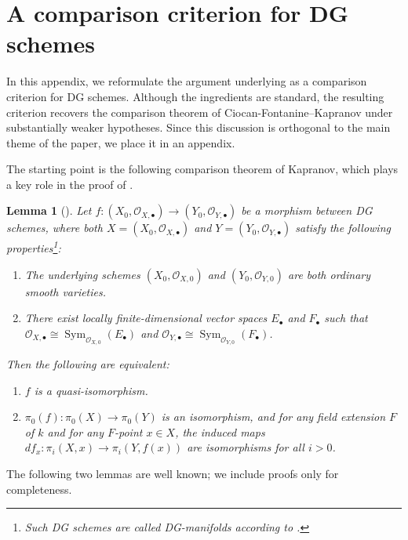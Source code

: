 \documentclass{article}
\numberwithin{equation}{section} %
\theoremstyle{plain}
\newtheorem{lemma}[theorem]{Lemma}
\theoremstyle{definition}
\theoremstyle{remark}
\begin{document}
\appendix

\section{A comparison criterion for DG schemes}

In this appendix, we reformulate the argument underlying  as a comparison criterion for DG schemes.
Although the ingredients are standard, the resulting criterion recovers the comparison theorem of Ciocan-Fontanine–Kapranov under substantially weaker hypotheses.
Since this discussion is orthogonal to the main theme of the paper, we place it in an appendix.

The starting point is the following comparison theorem of Kapranov, which plays a key role in the proof of \cite[Theorem 21]{BFR14}.

\begin{lemma}[{\cite[Proposition 1.3]{K01}}]\label{Lemma_DerSchComparison}
Let $f:(X_0,\mathcal{O}_{X,\bullet})\to(Y_0,\mathcal{O}_{Y,\bullet})$ be a morphism between DG schemes, where both $X=(X_0,\mathcal{O}_{X,\bullet})$ and $Y=(Y_0,\mathcal{O}_{Y,\bullet})$ satisfy the following properties\footnote{Such DG schemes are called DG-manifolds according to \cite{K01,CK01}.}:
\begin{enumerate}
\item The underlying schemes $(X_0,\mathcal{O}_{X,0})$ and $(Y_0,\mathcal{O}_{Y,0})$ are both ordinary smooth varieties.
\item There exist locally finite-dimensional vector spaces $E_\bullet$ and $F_\bullet$ such that $\mathcal{O}_{X,\bullet}\cong\operatorname{Sym}_{\mathcal{O}_{X,0}}(E_\bullet)$ and $\mathcal{O}_{Y,\bullet}\cong\operatorname{Sym}_{\mathcal{O}_{Y,0}}(F_\bullet)$.
\end{enumerate}
Then the following are equivalent:
\begin{enumerate}[label=(\alph*)]
\item $f$ is a quasi-isomorphism.
\item $\pi_0(f):\pi_0(X)\to\pi_0(Y)$ is an isomorphism, and for any field extension $F$ of $k$ and for any $F$-point $x\in X$, the induced maps $df_x:\pi_i(X,x)\to\pi_i(Y,f(x))$ are isomorphisms for all $i>0$.
\end{enumerate}
\end{lemma}

The following two lemmas are well known; we include proofs only for completeness.
\end{document}
